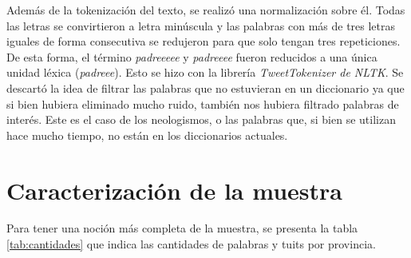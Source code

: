 Además de la tokenización del texto, se realizó una normalización sobre él. Todas las letras se convirtieron a letra minúscula y las palabras con más de tres letras iguales de forma consecutiva se redujeron para que solo tengan tres repeticiones. De esta forma, el término \textit{padreeeee} y \textit{padreeee} fueron reducidos a una única unidad léxica (\textit{padreee}). Esto se hizo con la librería \textit{TweetTokenizer de NLTK}. 
Se descartó la idea de filtrar las palabras que no estuvieran en un diccionario ya que si bien hubiera eliminado mucho ruido, también nos hubiera filtrado palabras de interés. Este es el caso de los neologismos, o las palabras que, si bien se utilizan hace mucho tiempo, no están en los diccionarios actuales.

\section{Caracterización de la muestra}

Para tener una noción más completa de la muestra, se presenta la tabla \ref{tab:cantidades} que indica las cantidades de palabras y tuits por provincia.


